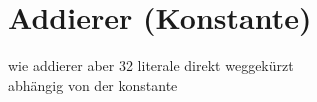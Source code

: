\section{Addierer (Konstante)}
\label{sec:knf:konstadd}


wie addierer aber 32 literale direkt weggekürzt\\
abhängig von der konstante